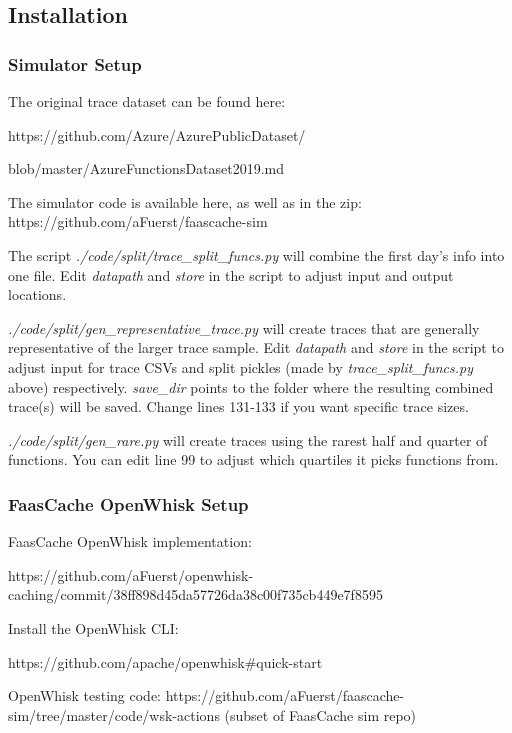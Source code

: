 {%
\subsection{Installation}

\subsubsection{Simulator Setup}

The original trace dataset can be found here:

https://github.com/Azure/AzurePublicDataset/

blob/master/AzureFunctionsDataset2019.md

The simulator code is available here, as well as in the zip:
https://github.com/aFuerst/faascache-sim

The script {\em ./code/split/trace\_split\_funcs.py} will combine the first day's info into one file.
Edit {\em datapath} and {\em store} in the script to adjust input and output locations.


{\em ./code/split/gen\_representative\_trace.py} will create traces that are generally representative of the larger trace sample.
Edit {\em datapath} and {\em store} in the script to adjust input for trace CSVs and split pickles (made by {\em trace\_split\_funcs.py} above) respectively.
{\em save\_dir} points to the folder where the resulting combined trace(s) will be saved.
Change lines 131-133 if you want specific trace sizes.

{\em ./code/split/gen\_rare.py} will create traces using the rarest half and quarter of functions.
You can edit line 99 to adjust which quartiles it picks functions from.
	

\subsubsection{FaasCache OpenWhisk Setup}

FaasCache OpenWhisk implementation:

https://github.com/aFuerst/openwhisk-caching/commit/38ff898d45da57726da38c00f735cb449e7f8595

Install the OpenWhisk CLI:

https://github.com/apache/openwhisk\#quick-start

OpenWhisk testing code: https://github.com/aFuerst/faascache-sim/tree/master/code/wsk-actions
(subset of FaasCache sim repo)

}
